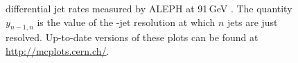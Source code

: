 \begin{figure}[tp]
  \centering
  \caption{\ee differential jet rates measured by ALEPH at 91\,GeV \cite{Heister:2003aj}.  The quantity $y_{n-1,n}$ is
    the value of the \kt-jet resolution at which $n$ jets are just
    resolved.  Up-to-date versions of these plots can be found at
  \url{http://mcplots.cern.ch/}.}
  \label{fig:cmp:eejetrates}
\end{figure}

